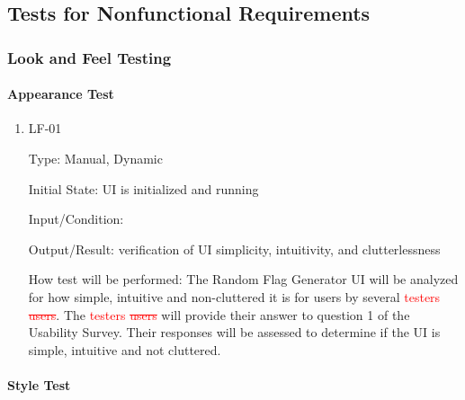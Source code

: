 \documentclass[12pt, titlepage]{article}
\begin{document}
\subsection{Tests for Nonfunctional Requirements}

\subsubsection{Look and Feel Testing}
		
\paragraph{Appearance Test}

\begin{enumerate}

\item{LF-01\\}

Type: Manual, Dynamic

Initial State: UI is initialized and running

Input/Condition: 

Output/Result: verification of UI simplicity, intuitivity, and clutterlessness

How test will be performed: The Random Flag Generator UI will be analyzed for
how simple, intuitive and non-cluttered it is for users by several
\textcolor{red}{testers \sout{users}}. The \textcolor{red}{testers
\sout{users}} will provide their answer to question 1 of the Usability Survey.
Their responses will be assessed to determine if the UI is simple, intuitive
and not cluttered.

\end{enumerate}

\paragraph{Style Test}
\end{document}
